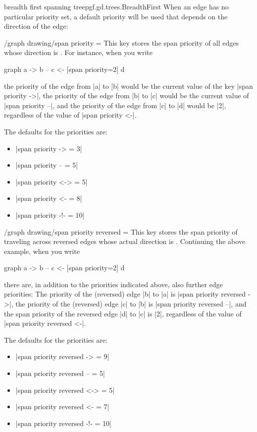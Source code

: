 \begin{gdalgorithm}{breadth first spanning tree}{pgf.gd.trees.BreadthFirst}
  When an edge has no particular priority set, a default priority will
  be used that depends on the direction of the edge:
  \begin{key}{/graph drawing/span priority
      =}
    This key stores the span priority of all edges whose direction is
    . For instance, when you write
\begin{codeexample}
graph { a -> b -- c <- [span priority=2] d }      
\end{codeexample}
    the priority of the edge from |a| to |b| would be the current
    value of the key |span priority ->|, the priority of the edge from
    |b| to |c| would be the current value of |span priority --|, and
    the priority of the edge from |c| to |d| would be |2|, regardless
    of the value of |span priority <-|.

    The defaults for the priorities are:
    \begin{itemize}
    \item |span priority ->  = 3|
    \item |span priority --  = 5|
    \item |span priority <-> = 5|
    \item |span priority <-  = 8|
    \item |span priority -!- = 10|
    \end{itemize}
  \end{key}
  \begin{key}{/graph drawing/span priority reversed =}
    This key stores the span priority of traveling across reversed
    edges whose actual direction is . Continuing the
    above example, when you write
\begin{codeexample}
graph { a -> b -- c <- [span priority=2] d }      
\end{codeexample}
    there are, in addition to the priorities indicated above, also
    further edge priorities: The priority of the (reversed) edge |b|
    to |a| is |span priority reversed ->|, the priority of the
    (reversed) edge |c| to |b| is |span priority reversed --|, and the
    span priority of the reversed edge |d| to |c| is |2|, regardless
    of the value of |span priority reversed <-|. 

    The defaults for the priorities are:
    \begin{itemize}
    \item |span priority reversed ->  = 9|
    \item |span priority reversed --  = 5|
    \item |span priority reversed <-> = 5|
    \item |span priority reversed <-  = 7|
    \item |span priority reversed -!- = 10|
    \end{itemize}
  \end{key}
  

\end{gdalgorithm}
